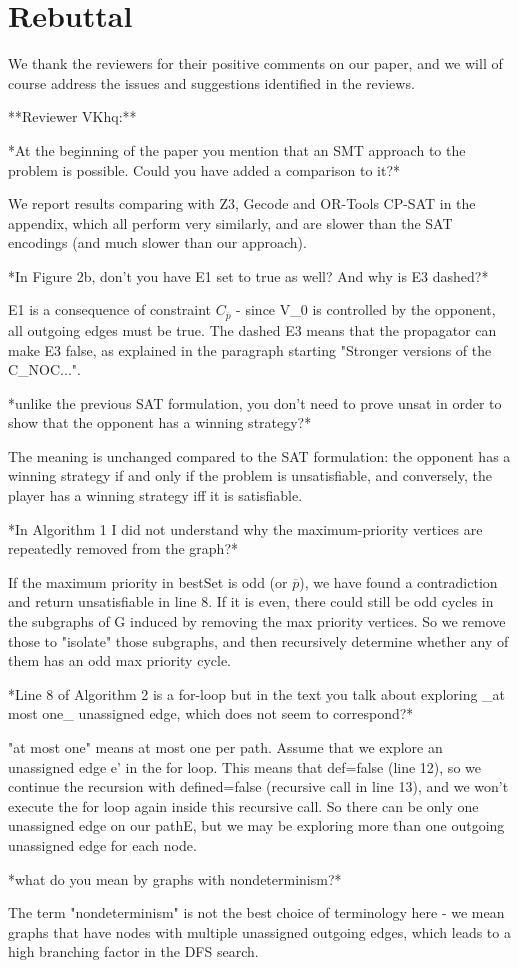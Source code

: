 \documentclass{article}
\begin{document}
\section{Rebuttal}

We thank the reviewers for their positive comments on our paper, and we will of course address the issues and suggestions identified in the reviews.

**Reviewer VKhq:**

*At the beginning of the paper you mention that an SMT approach to the problem is possible. Could you have added a comparison to it?*

We report results comparing with Z3, Gecode and OR-Tools CP-SAT in the appendix, which all perform very similarly, and are slower than the SAT encodings (and much slower than our approach).

*In Figure 2b, don’t you have E1 set to true as well? And why is E3 dashed?*

E1 is a consequence of constraint $C_\overline{p}$ - since V_0 is controlled by the opponent, all outgoing edges must be true. The dashed E3 means that the propagator can make E3 false, as explained in the paragraph starting "Stronger versions of the C_NOC...".

*unlike the previous SAT formulation, you don't need to prove unsat in order to show that the opponent has a winning strategy?*

The meaning is unchanged compared to the SAT formulation: the opponent has a winning strategy if and only if the problem is unsatisfiable, and conversely, the player has a winning strategy iff it is satisfiable.

*In Algorithm 1 I did not understand why the maximum-priority vertices are repeatedly removed from the graph?*

If the maximum priority in bestSet is odd (or $\overline{p}$), we have found a contradiction and return unsatisfiable in line 8. If it is even, there could still be odd cycles in the subgraphs of G induced by removing the max priority vertices. So we remove those to "isolate" those subgraphs, and then recursively determine whether any of them has an odd max priority cycle.

*Line 8 of Algorithm 2 is a for-loop but in the text you talk about exploring _at most one_ unassigned edge, which does not seem to correspond?*

"at most one" means at most one per path. Assume that we explore an unassigned edge e' in the for loop. This means that def=false (line 12), so we continue the recursion with defined=false (recursive call in line 13), and we won't execute the for loop again inside this recursive call. So there can be only one unassigned edge on our pathE, but we may be exploring more than one outgoing unassigned edge for each node.

*what do you mean by graphs with nondeterminism?*

The term "nondeterminism" is not the best choice of terminology here - we mean graphs that have nodes with multiple unassigned outgoing edges, which leads to a high branching factor in the DFS search.
\end{document}
